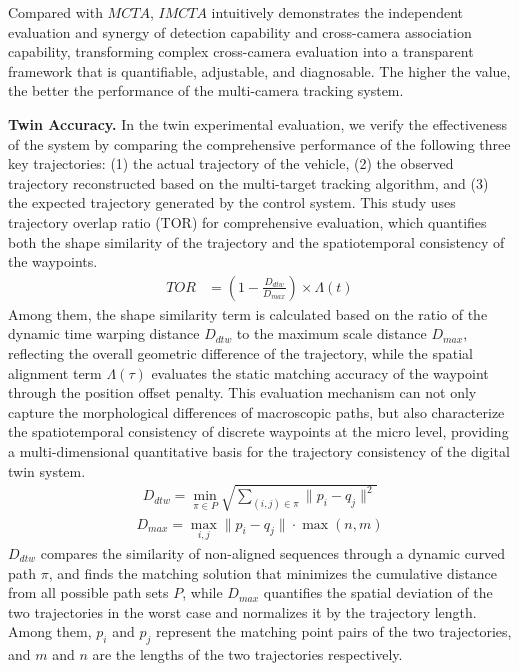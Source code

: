 \documentclass[lettersize,journal]{IEEEtran}
\begin{document}
Compared with \(MCTA\), \(IMCTA\) intuitively demonstrates the independent evaluation and synergy of detection capability and cross-camera association capability, transforming complex cross-camera evaluation into a transparent framework that is quantifiable, adjustable, and diagnosable. 
The higher the value, the better the performance of the multi-camera tracking system.

\textbf{Twin Accuracy.}
In the twin experimental evaluation, we verify the effectiveness of the system by comparing the comprehensive performance of the following three key trajectories: (1) the actual trajectory of the vehicle, (2) the observed trajectory reconstructed based on the multi-target tracking algorithm, and (3) the expected trajectory generated by the control system.
This study uses trajectory overlap ratio (TOR) for comprehensive evaluation, which quantifies both the shape similarity of the trajectory and the spatiotemporal consistency of the waypoints.
\begin{align}
	TOR & = \left(1 - \frac{D_{dtw}}{D_{max}}\right) \times \Lambda(t)
\end{align}
Among them, the shape similarity term is calculated based on the ratio of the dynamic time warping distance \(D_{dtw}\) to the maximum scale distance \(D_{max}\), reflecting the overall geometric difference of the trajectory, while the spatial alignment term \(\Lambda(\tau)\) evaluates the static matching accuracy of the waypoint through the position offset penalty.
This evaluation mechanism can not only capture the morphological differences of macroscopic paths, but also characterize the spatiotemporal consistency of discrete waypoints at the micro level, providing a multi-dimensional quantitative basis for the trajectory consistency of the digital twin system.
\begin{align}
	D_{dtw} = \min_{\pi \in P} \sqrt{\sum_{(i,j)\in\pi} \|p_i - q_j\|^2}
\end{align}
\begin{align}
	D_{max} = \max_{i,j} \|p_i - q_j\| \cdot \max(n,m)
\end{align}
\(D_{dtw}\) compares the similarity of non-aligned sequences through a dynamic curved path \(\pi\), and finds the matching solution that minimizes the cumulative distance from all possible path sets \(P\), while \(D_{max}\) quantifies the spatial deviation of the two trajectories in the worst case and normalizes it by the trajectory length. Among them, \(p_{i}\) and \(p_{j}\) represent the matching point pairs of the two trajectories, and \(m\) and \(n\) are the lengths of the two trajectories respectively.
\end{document}
